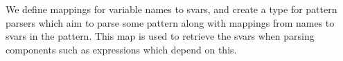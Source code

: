 We define mappings for variable names to svars, and create a type for pattern
parsers which aim to parse some pattern along with mappings from names to
svars in the pattern. This map is used to retrieve the svars when parsing
components such as expressions which depend on this.

\begin{code}%
\>[0]\AgdaSpace{}%
\AgdaSymbol{:}\AgdaSpace{}%
\AgdaSpace{}%
\AgdaSpace{}%
\AgdaSpace{}%
\<%
\\
\>[0]\AgdaSpace{}%
\AgdaSpace{}%
\AgdaSymbol{=}\AgdaSpace{}%
\AgdaFunction{Σ[}\AgdaSpace{}%
\AgdaSpace{}%
\AgdaSpace{}%
\AgdaSpace{}%
\AgdaFunction{]}\AgdaSpace{}%
\AgdaSpace{}%
\AgdaSpace{}%
\<%
\\
%
\\[\AgdaEmptyExtraSkip]%
\>[0]\AgdaSpace{}%
\AgdaSymbol{:}\AgdaSpace{}%
\AgdaSpace{}%
\AgdaSpace{}%
\AgdaSpace{}%
\<%
\\
\>[0]\AgdaSpace{}%
\AgdaSpace{}%
\AgdaSymbol{=}\AgdaSpace{}%
\AgdaSpace{}%
\AgdaSymbol{(}\AgdaSpace{}%
\AgdaSymbol{)}\<%
\\
%
\\[\AgdaEmptyExtraSkip]%
\>[0]\AgdaSpace{}%
\AgdaSymbol{:}\AgdaSpace{}%
\AgdaSpace{}%
\AgdaSpace{}%
\<%
\\
\>[0]\AgdaSpace{}%
\AgdaSpace{}%
\AgdaSymbol{=}\AgdaSpace{}%
\AgdaSpace{}%
\AgdaSymbol{(}\AgdaFunction{Σ[}\AgdaSpace{}%
\AgdaSpace{}%
\AgdaSpace{}%
\AgdaSpace{}%
\AgdaSpace{}%
\AgdaFunction{]}\AgdaSpace{}%
\AgdaSpace{}%
\AgdaSymbol{)}\<%
\end{code}

